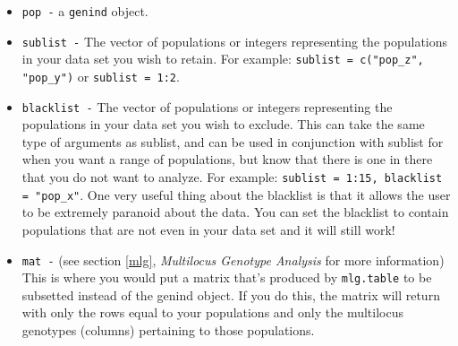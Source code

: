 \documentclass[letterpaper]{article}\usepackage[]{graphicx}\usepackage[]{color}
\begin{document}
\begin{itemize}
  \item \texttt{pop -} a \texttt{genind} object.
  \item \texttt{sublist -} The vector of populations or integers representing the populations in your data set you wish to retain. For example: \texttt{sublist = c("pop\_z", "pop\_y")} or \texttt{sublist = 1:2}.
  \item \texttt{blacklist -} The vector of populations or integers representing the populations in your data set you wish to exclude. This can take the same type of arguments as sublist, and can be used in conjunction with sublist for when you want a range of populations, but know that there is one in there that you do not want to analyze. For example: \texttt{sublist = 1:15, blacklist = "pop\_x"}.
  One very useful thing about the blacklist is that it allows the user to be extremely paranoid about the data. You can set the blacklist to contain populations that are not even in your data set and it will still work!
  \item \texttt{mat -} (see section \ref{mlg}, \textit{Multilocus Genotype Analysis} for more information) This is where you would put a matrix that's produced by \texttt{mlg.table} to be subsetted instead of the genind object. If you do this, the matrix will return with only the rows equal to your populations and only the multilocus genotypes (columns) pertaining to those populations. 
\end{itemize}
\end{document}
